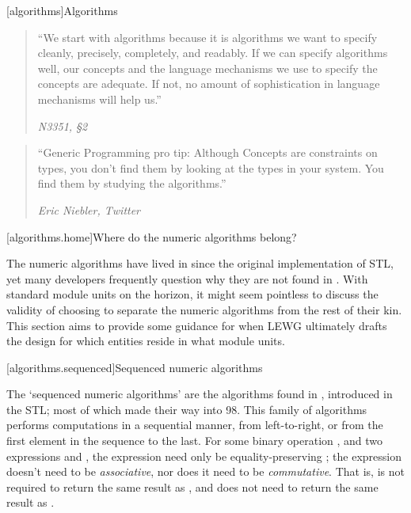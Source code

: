 [algorithms]{Algorithms}

\begin{quote}
``We start with algorithms because it is algorithms we want to specify cleanly, precisely,
completely, and readably. If we can specify algorithms well, our concepts and the language
mechanisms we use to specify the concepts are adequate. If not, no amount of sophistication in
language mechanisms will help us.''
\begin{flushright}
\textemdash \textit{N3351, §2}
\end{flushright}
\end{quote}

\begin{quote}
``Generic Programming pro tip: Although Concepts are constraints on types, you don't find them by
looking at the types in your system. You find them by studying the algorithms.''
\begin{flushright}
\textemdash \textit{Eric Niebler, Twitter}
\end{flushright}
\end{quote}

[algorithms.home]{Where do the numeric algorithms belong?}

The numeric algorithms have lived in  since the original implementation of STL, yet
many developers frequently question why they are not found in . With standard
module units on the horizon, it might seem pointless to discuss the validity of choosing to separate
the numeric algorithms from the rest of their kin. This section aims to provide some guidance for
when LEWG ultimately drafts the design for which entities reside in what module units.


[algorithms.sequenced]{Sequenced numeric algorithms}

The `sequenced numeric algorithms' are the algorithms found in , introduced in the
STL; most of which made their way into \Cpp{}98. This family of algorithms performs computations in
a sequential manner, from left-to-right, or from the first element in the sequence to the last.
For some binary operation , and two expressions  and , the expression
 need only be equality-preserving ; the expression
 doesn't need to be \textit{associative}, nor does it need to be
\textit{commutative}. That is,  is not required to return the same result
as , and  does not need to return the same result as
.

